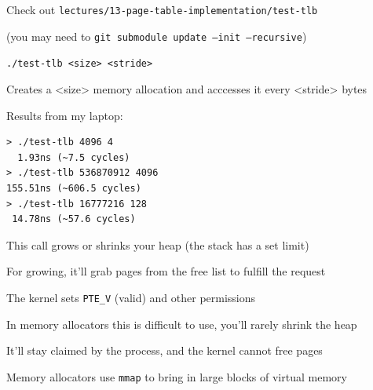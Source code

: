  \begin{slide}


    Check out \texttt{lectures/13-page-table-implementation/test-tlb}

    \leftspace{}(you may need to \texttt{git submodule update --init --recursive})
    \medskip

    \texttt{./test-tlb <size> <stride>}

    \leftspace{}Creates a <size> memory allocation and acccesses it every <stride> bytes
    \medskip

    Results from my laptop:
    \begin{verbatim}
> ./test-tlb 4096 4        
  1.93ns (~7.5 cycles)
> ./test-tlb 536870912 4096
155.51ns (~606.5 cycles)
> ./test-tlb 16777216 128  
 14.78ns (~57.6 cycles)
    \end{verbatim}

  \end{slide}

  \begin{slide}


    This call grows or shrinks your heap (the stack has a set limit)
    \medskip

    For growing, it'll grab pages from the free list to fulfill the request

    \leftspace{}The kernel sets \texttt{PTE\_V} (valid) and other permissions
    \medskip

    In memory allocators this is difficult to use, you'll rarely shrink the heap

    \leftspace{}It'll stay claimed by the process, and the kernel cannot free
    pages
    \medskip

    Memory allocators use \texttt{mmap} to bring in large blocks of virtual
    memory

  \end{slide}

